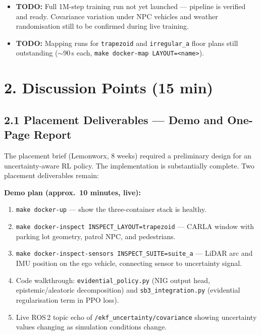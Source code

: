 \documentclass[11pt,a4paper]{article}
\newcommand{\todo}[1]{\textcolor{todo}{\textbf{TODO:}} #1}
\begin{document}
\begin{itemize}[leftmargin=*]
  \item \todo{Full 1M-step training run not yet launched --- pipeline is
    verified and ready. Covariance variation under NPC vehicles and weather
    randomisation still to be confirmed during live training.}

  \item \todo{Mapping runs for \texttt{trapezoid} and \texttt{irregular\_a}
    floor plans still outstanding ($\sim$90\,s each,
    \texttt{make docker-map LAYOUT=<name>}).}
\end{itemize}

\section*{2. Discussion Points (15 min)}

\subsection*{2.1 Placement Deliverables --- Demo and One-Page Report}

The placement brief (Lemonworx, 8 weeks) required a preliminary design for an
uncertainty-aware RL policy. The implementation is substantially complete. Two
placement deliverables remain:

\textbf{Demo plan (approx.\ 10 minutes, live):}
\begin{enumerate}
  \item \texttt{make docker-up} --- show the three-container stack is healthy.
  \item \texttt{make docker-inspect INSPECT\_LAYOUT=trapezoid} --- CARLA window
    with parking lot geometry, patrol NPC, and pedestrians.
  \item \texttt{make docker-inspect-sensors INSPECT\_SUITE=suite\_a} --- LiDAR
    arc and IMU position on the ego vehicle, connecting sensor to uncertainty signal.
  \item Code walkthrough: \texttt{evidential\_policy.py} (NIG output head,
    epistemic/aleatoric decomposition) and \texttt{sb3\_integration.py}
    (evidential regularisation term in PPO loss).
  \item Live ROS\,2 topic echo of \texttt{/ekf\_uncertainty/covariance} showing
    uncertainty values changing as simulation conditions change.
\end{enumerate}
\end{document}
